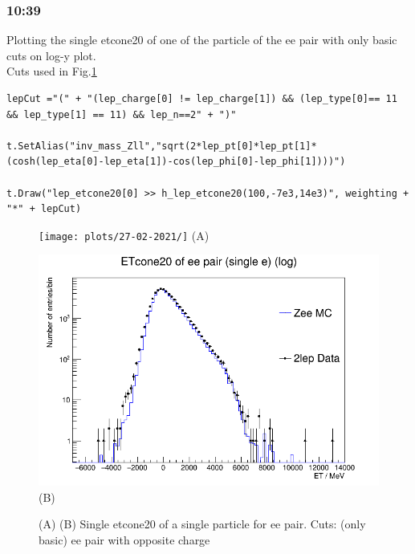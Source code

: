 \subsubsection*{10:39}
Plotting the single etcone20 of one of the particle of the ee pair with only basic cuts on log-y plot.
\\
Cuts used in Fig.\ref{fig:2-Stack-Zee-fast_etcone[0]_(basic-ee_opp-c)_27-02-21_10-39}
\begin{lstlisting}
lepCut ="(" + "(lep_charge[0] != lep_charge[1]) && (lep_type[0]== 11 && lep_type[1] == 11) && lep_n==2" + ")"    
    
t.SetAlias("inv_mass_Zll","sqrt(2*lep_pt[0]*lep_pt[1]*(cosh(lep_eta[0]-lep_eta[1])-cos(lep_phi[0]-lep_phi[1])))")

t.Draw("lep_etcone20[0] >> h_lep_etcone20(100,-7e3,14e3)", weighting + "*" + lepCut)
\end{lstlisting}

\begin{figure}[h!]
    \centering
    \begin{minipage}{0.5\textwidth}
        \centering
        \texttt{[image: plots/27-02-2021/]}
        (A)
    \end{minipage}\hfill
    \begin{minipage}{0.5\textwidth}
        \centering
        \includegraphics[width=\linewidth]{plots/27-02-2021/2-Stack-Zee-fast_etcone[0]_(basic-ee_opp-c)_27-02-21_10-39.png}
        (B)
    \end{minipage}
    \caption{(A)  (B) Single etcone20 of a single particle for ee pair.  Cuts: (only basic) ee pair with opposite charge}
    \label{fig:2-Stack-Zee-fast_etcone[0]_(basic-ee_opp-c)_27-02-21_10-39}
\end{figure}

